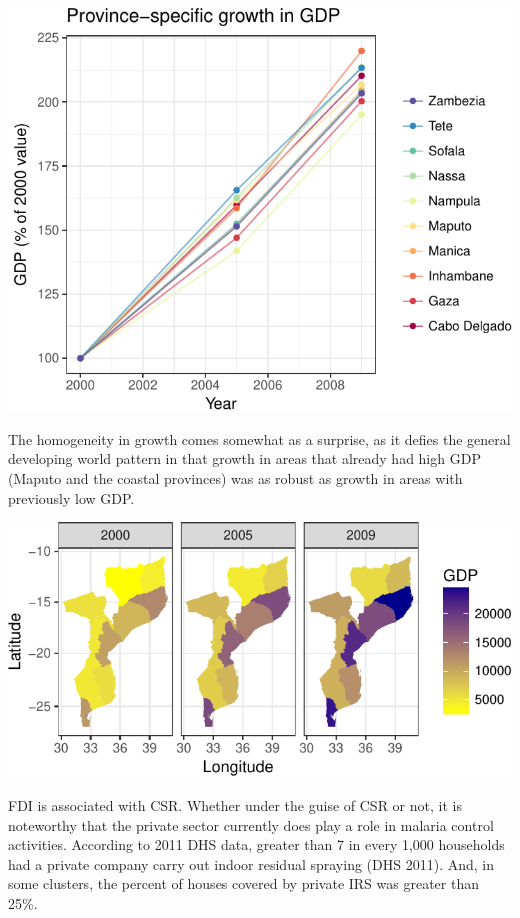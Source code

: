 \documentclass[]{article}
\begin{document}
\begin{center}\includegraphics{figures/unnamed-chunk-13-1} \end{center}

The homogeneity in growth comes somewhat as a surprise, as it defies the
general developing world pattern in that growth in areas that already
had high GDP (Maputo and the coastal provinces) was as robust as growth
in areas with previously low GDP.

\begin{center}\includegraphics{figures/unnamed-chunk-14-1} \end{center}

FDI is associated with CSR. Whether under the guise of CSR or not, it is
noteworthy that the private sector currently does play a role in malaria
control activities. According to 2011 DHS data, greater than 7 in every
1,000 households had a private company carry out indoor residual
spraying (DHS 2011). And, in some clusters, the percent of houses
covered by private IRS was greater than 25\%.
\end{document}
